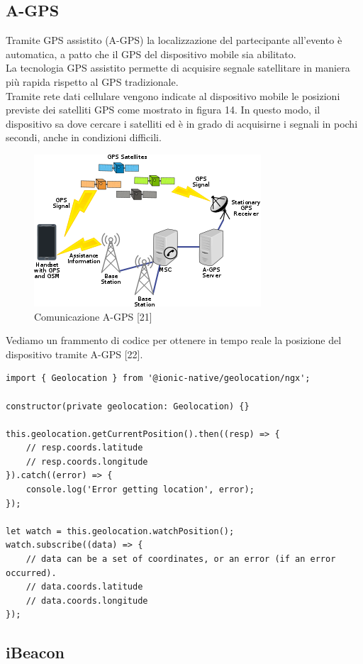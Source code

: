 \subsection{A-GPS}

Tramite GPS assistito (A-GPS) la localizzazione del partecipante all'evento è automatica,
a patto che il GPS del dispositivo mobile sia abilitato.\\
La tecnologia GPS assistito permette di acquisire segnale satellitare in maniera più rapida
rispetto al GPS tradizionale.\\
Tramite rete dati cellulare vengono indicate al dispositivo mobile le posizioni previste dei
satelliti GPS come mostrato in figura 14. In questo modo, il dispositivo sa dove cercare i satelliti ed è in grado di acquisirne 
i segnali in pochi secondi, anche in condizioni difficili.
\begin{figure}[H]
    \centering  
    \caption{Comunicazione A-GPS [21]}
    \includegraphics[scale=0.7]{img/cap2/gps}
\end{figure}
Vediamo un frammento di codice per ottenere in tempo reale la 
posizione del dispositivo tramite A-GPS [22].
\begin{lstlisting}
import { Geolocation } from '@ionic-native/geolocation/ngx';

constructor(private geolocation: Geolocation) {}

this.geolocation.getCurrentPosition().then((resp) => {
    // resp.coords.latitude
    // resp.coords.longitude
}).catch((error) => {
    console.log('Error getting location', error);
});

let watch = this.geolocation.watchPosition();
watch.subscribe((data) => {
    // data can be a set of coordinates, or an error (if an error occurred).
    // data.coords.latitude
    // data.coords.longitude
});
\end{lstlisting}

\subsection{iBeacon}

